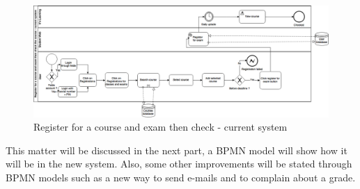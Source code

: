 \begin{figure}[H]
	\begin{center}
		\centerline{\includegraphics[scale=0.4]{addcoursecurrentsystem}}
		\caption[Register for a course and exam then check - current system]{Register for a course and exam then check - current system}
		\label{fig:addcourse}
	\end{center}
\end{figure}

This matter will be discussed in the next part, a BPMN model will show how it will be in the new system. Also, some other improvements will be stated through BPMN models such as a new way to send e-mails and to complain about a grade. 
